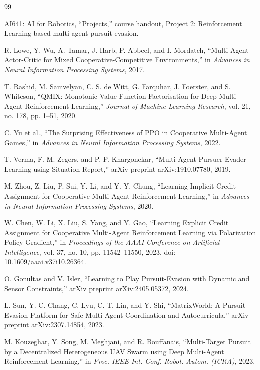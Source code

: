 \documentclass[journal]{IEEEtran}
\begin{document}

\begin{thebibliography}{99}

AI641: AI for Robotics, ``Projects,'' course handout, Project 2: Reinforcement Learning-based multi-agent pursuit-evasion.

R. Lowe, Y. Wu, A. Tamar, J. Harb, P. Abbeel, and I. Mordatch,
``Multi-Agent Actor-Critic for Mixed Cooperative-Competitive Environments,''
in \textit{Advances in Neural Information Processing Systems}, 2017.

T. Rashid, M. Samvelyan, C. S. de Witt, G. Farquhar, J. Foerster, and S. Whiteson,
``QMIX: Monotonic Value Function Factorisation for Deep Multi-Agent Reinforcement Learning,''
\textit{Journal of Machine Learning Research}, vol. 21, no. 178, pp. 1--51, 2020.

C. Yu et al.,
``The Surprising Effectiveness of PPO in Cooperative Multi-Agent Games,''
in \textit{Advances in Neural Information Processing Systems}, 2022.

T. Verma, F. M. Zegers, and P. P. Khargonekar,
``Multi-Agent Pursuer-Evader Learning using Situation Report,''
arXiv preprint arXiv:1910.07780, 2019.

M. Zhou, Z. Liu, P. Sui, Y. Li, and Y. Y. Chung,
``Learning Implicit Credit Assignment for Cooperative Multi-Agent Reinforcement Learning,''
in \textit{Advances in Neural Information Processing Systems}, 2020.

W. Chen, W. Li, X. Liu, S. Yang, and Y. Gao,
``Learning Explicit Credit Assignment for Cooperative Multi-Agent Reinforcement Learning via Polarization Policy Gradient,''
in \textit{Proceedings of the AAAI Conference on Artificial Intelligence},
vol. 37, no. 10, pp. 11542--11550, 2023,
doi: 10.1609/aaai.v37i10.26364.

O. Gonultas and V. Isler,
``Learning to Play Pursuit-Evasion with Dynamic and Sensor Constraints,''
arXiv preprint arXiv:2405.05372, 2024.

L. Sun, Y.-C. Chang, C. Lyu, C.-T. Lin, and Y. Shi,
``MatrixWorld: A Pursuit-Evasion Platform for Safe Multi-Agent Coordination and Autocurricula,''
arXiv preprint arXiv:2307.14854, 2023.

M. Kouzeghar, Y. Song, M. Meghjani, and R. Bouffanais,
``Multi-Target Pursuit by a Decentralized Heterogeneous UAV Swarm using Deep Multi-Agent Reinforcement Learning,''
in \textit{Proc. IEEE Int. Conf. Robot. Autom. (ICRA)}, 2023.


\end{thebibliography}
\end{document}
